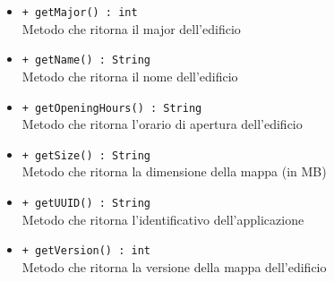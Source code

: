 \documentclass[../DefinizioneDiProdotto.tex]{subfiles}
\begin{document}
\begin{description}
\begin{itemize}
		\item \texttt{+ getMajor() : int}\\
		Metodo che ritorna il major dell'edificio
		\item \texttt{+ getName() : String}\\
		Metodo che ritorna il nome dell'edificio
		\item \texttt{+ getOpeningHours() : String}\\
		Metodo che ritorna l'orario di apertura dell'edificio
		\item \texttt{+ getSize() : String}\\
		Metodo che ritorna la dimensione della mappa (in MB)
		\item \texttt{+ getUUID() : String}\\
		Metodo che ritorna l'identificativo dell'applicazione
		\item \texttt{+ getVersion() : int}\\
		Metodo che ritorna la versione della mappa dell'edificio
	\end{itemize}
\end{description}
\end{document}
